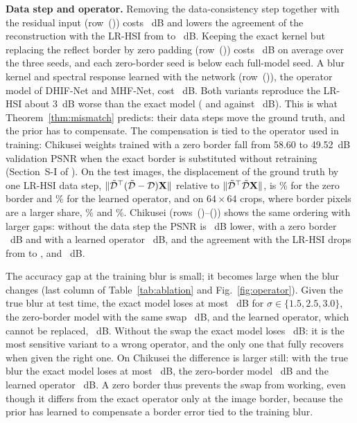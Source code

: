 \documentclass[journal]{IEEEtran}
\begin{document}
\textbf{Data step and operator.} Removing the data-consistency step together with the residual input (row~()) costs ~dB and lowers the agreement of the reconstruction with the LR-HSI from  to ~dB. Keeping the exact kernel but replacing the reflect border by zero padding (row~()) costs ~dB on average over the three seeds, and each zero-border seed is below each full-model seed. A blur kernel and spectral response learned with the network (row~()), the operator model of DHIF-Net and MHF-Net, cost ~dB. Both variants reproduce the LR-HSI about 3~dB worse than the exact model ( and  against ~dB). This is what Theorem~\ref{thm:mismatch} predicts: their data steps move the ground truth, and the prior has to compensate. The compensation is tied to the operator used in training: Chikusei weights trained with a zero border fall from 58.60 to 49.52~dB validation PSNR when the exact border is substituted without retraining (Section~S-I of \supp). On the test images, the displacement of the ground truth by one LR-HSI data step, $\|\tilde{\mathcal{D}}^{\top}(\tilde{\mathcal{D}}-\mathcal{D})\mathbf{X}\|$ relative to $\|\tilde{\mathcal{D}}^{\top}\tilde{\mathcal{D}}\mathbf{X}\|$, is \% for the zero border and \% for the learned operator, and on $64\times64$ crops, where border pixels are a larger share, \% and \%. Chikusei (rows~()--()) shows the same ordering with larger gaps: without the data step the PSNR is ~dB lower, with a zero border ~dB and with a learned operator ~dB, and the agreement with the LR-HSI drops from  to ,  and ~dB.

The accuracy gap at the training blur is small; it becomes large when the blur changes (last column of Table~\ref{tab:ablation} and Fig.~\ref{fig:operator}). Given the true blur at test time, the exact model loses at most ~dB for $\sigma\in\{1.5,2.5,3.0\}$, the zero-border model with the same swap ~dB, and the learned operator, which cannot be replaced, ~dB. Without the swap the exact model loses ~dB: it is the most sensitive variant to a wrong operator, and the only one that fully recovers when given the right one. On Chikusei the difference is larger still: with the true blur the exact model loses at most ~dB, the zero-border model ~dB and the learned operator ~dB. A zero border thus prevents the swap from working, even though it differs from the exact operator only at the image border, because the prior has learned to compensate a border error tied to the training blur.
\end{document}
